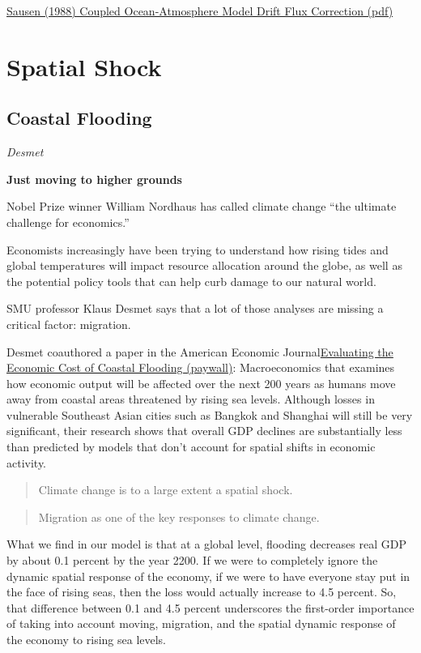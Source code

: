 \documentclass[
]{book}
\begin{document}
\href{pdf/Barthel_1988_Coupled_ocean_atmosphere_models_with_flux_corection.pdf}{Sausen (1988) Coupled Ocean-Atmosphere Model Drift Flux Correction (pdf)}

\hypertarget{spatial-shock}{%
\section{Spatial Shock}\label{spatial-shock}}

\hypertarget{coastal-flooding}{%
\subsection{Coastal Flooding}\label{coastal-flooding}}

\emph{Desmet}

\textbf{Just moving to higher grounds}

Nobel Prize winner William Nordhaus has called climate change ``the ultimate challenge for economics.''

Economists increasingly have been trying to understand how rising tides and global temperatures will impact resource allocation around the globe, as well as the potential policy tools that can help curb damage to our natural world.

SMU professor Klaus Desmet says that a lot of those analyses are missing a critical factor: migration.

Desmet coauthored a paper in the American Economic Journal\href{https://www.aeaweb.org/articles?id=10.1257/mac.20180366}{Evaluating the Economic Cost of Coastal Flooding (paywall)}: Macroeconomics that examines how economic output will be affected over the next 200 years as humans move away from coastal areas threatened by rising sea levels. Although losses in vulnerable Southeast Asian cities such as Bangkok and Shanghai will still be very significant, their research shows that overall GDP declines are substantially less than predicted by models that don't account for spatial shifts in economic activity.

\begin{quote}
Climate change is to a large extent a spatial shock.
\end{quote}

\begin{quote}
Migration as one of the key responses to climate change.
\end{quote}

What we find in our model is that at a global level, flooding decreases real GDP by about 0.1 percent by the year 2200. If we were to completely ignore the dynamic spatial response of the economy, if we were to have everyone stay put in the face of rising seas, then the loss would actually increase to 4.5 percent. So, that difference between 0.1 and 4.5 percent underscores the first-order importance of taking into account moving, migration, and the spatial dynamic response of the economy to rising sea levels.
\end{document}
